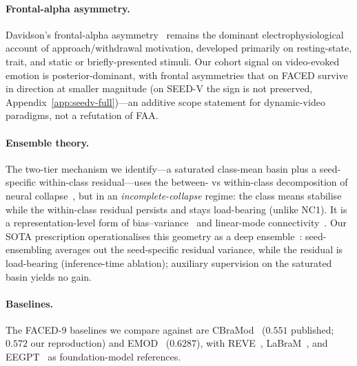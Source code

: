 \paragraph{Frontal-alpha asymmetry.}
Davidson's frontal-alpha asymmetry~\citep{davidson1992anterior,coan2004frontal,davidson2004wellbeing}
remains the dominant electrophysiological account of approach/withdrawal
motivation, developed primarily on resting-state, trait, and static or
briefly-presented stimuli. Our cohort signal on
video-evoked emotion is posterior-dominant, with frontal asymmetries
that on FACED survive in direction at smaller magnitude (on SEED-V the
sign is not preserved, Appendix~\ref{app:seedv-full})---an additive scope
statement for dynamic-video paradigms, not a refutation of FAA.

\paragraph{Ensemble theory.}
The two-tier mechanism we identify---a saturated class-mean basin
plus a seed-specific within-class residual---uses the between- vs
within-class decomposition of neural collapse~\citep{papyan2020prevalence},
but in an \emph{incomplete-collapse} regime: the class means stabilise
while the within-class residual persists and stays load-bearing (unlike
NC1). It is a representation-level
form of bias--variance~\citep{geman1992neural,krogh1995neural} and
linear-mode connectivity~\citep{frankle2020linearmode,wortsman2022model}.
Our SOTA prescription operationalises this geometry as a deep
ensemble~\citep{fort2019deepensembles}: seed-ensembling
averages out the seed-specific residual variance, while the residual is
load-bearing (inference-time ablation); auxiliary supervision on the
saturated basin yields no gain.

\paragraph{Baselines.}
The FACED-9 baselines we compare against are
CBraMod~\citep{wang2025cbramod} ($0.551$ published; $0.572$ our
reproduction) and
EMOD~\citep{chen2025emod} ($0.6287$), with
REVE~\citep{elouahidi2025reve}, LaBraM~\citep{jiang2024labram}, and
EEGPT~\citep{yue2024eegpt} as foundation-model references.
